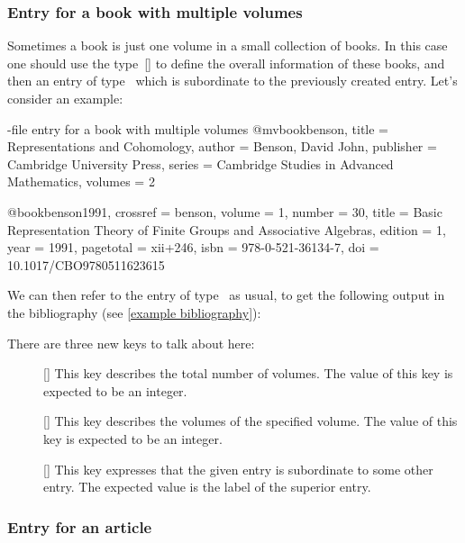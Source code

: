 \subsubsection{Entry for a book with multiple volumes}

Sometimes a book is just one volume in a small collection of books.
In this case one should use the type~[\atname] to define the overall information of these books, and then an entry of type~ which is subordinate to the previously created entry.
Let’s consider an example:
\begin{showcode}[label = {bib entry multiple volume book}]{-file entry for a book with multiple volumes}
@mvbook{benson,
  title     = {Representations and Cohomology},
  author    = {Benson, David John},
  publisher = {Cambridge University Press},
  series    = {Cambridge Studies in Advanced Mathematics},
  volumes   = {2}
}

@book{benson1991,
  crossref  = {benson},
  volume    = {1},
  number    = {30},
  title     = {Basic Representation Theory of Finite Groups and Associative Algebras},
  edition   = {1},
  year      = {1991},
  pagetotal = {xii+246},
  isbn      = {978-0-521-36134-7},
  doi       = {10.1017/CBO9780511623615}
}
\end{showcode}
We can then refer to the entry of type~ as usual, to get the following output in the bibliography (see \cref{example bibliography}):

There are three new keys to talk about here:
\begin{description}
  \item[]
    [\optname]
    This key describes the total number of volumes.
    The value of this key is expected to be an integer.
  \item[]
    [\optname]
    This key describes the volumes of the specified volume.
    The value of this key is expected to be an integer.
  \item[]
  [\optname]
    This key expresses that the given entry is subordinate to some other entry.
    The expected value is the label of the superior entry.
\end{description}

\subsubsection{Entry for an article}

